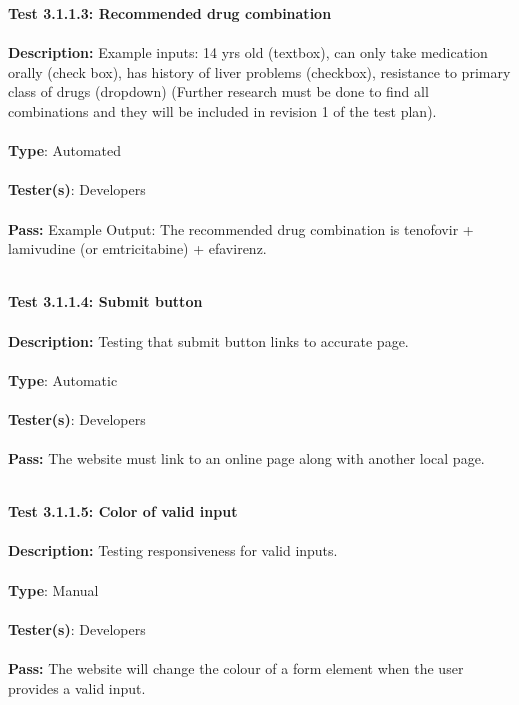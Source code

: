 \documentclass[12pt]{article}
\begin{document}
\begin{tcolorbox}
\textbf{Test 3.1.1.3: Recommended drug combination } \\ \\
\textbf{Description:} Example inputs: 14 yrs old (textbox), can only take medication orally (check box), has history of liver problems (checkbox), resistance to primary class of drugs (dropdown) (Further research must be done to find all combinations and they will be included in revision 1 of the test plan). \\ \\
\textbf{Type}: Automated \\ \\
\textbf{Tester(s)}: Developers \\ \\
\textbf{Pass:} Example Output: The recommended drug combination is tenofovir + lamivudine (or emtricitabine) + efavirenz. \\ \\
\end{tcolorbox}

\begin{tcolorbox}
\textbf{Test 3.1.1.4: Submit button} \\ \\
\textbf{Description:} Testing that submit button links to accurate page. \\ \\
\textbf{Type}: Automatic \\ \\
\textbf{Tester(s)}: Developers \\ \\
\textbf{Pass:} The website must link to an online page along with another local page. \\ \\
\end{tcolorbox}

\begin{tcolorbox}
\textbf{Test 3.1.1.5: Color of valid input} \\ \\
\textbf{Description:} Testing responsiveness for valid inputs.  \\ \\
\textbf{Type}: Manual \\ \\
\textbf{Tester(s)}: Developers \\ \\
\textbf{Pass:} The website will change the colour of a form element when the user provides a valid input. \\ \\
\end{tcolorbox}
\end{document}

